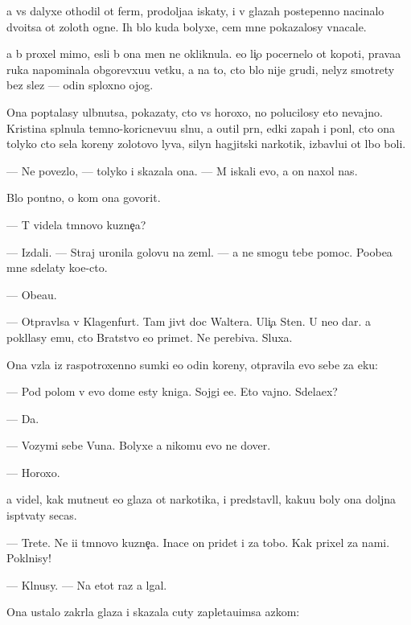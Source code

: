 \documentclass[10pt]{book}
\begin{document}
{\Y}a vs{\e} dalyxe othodil ot ferm{\yi}, prodolja{\y}a iskaty, i v glazah postepenno nacinalo dvo{\y}itsa ot zolot{\yi}h ogne{\y}. Ih b{\yi}lo kuda bolyxe, cem mne pokazalosy vnacale.

{\Y}a b{\yi} proxel mimo, {\y}esli b{\yi} ona men{\ia} ne okliknula. {\y}e{\y}o li{\c}o pocernelo ot kopoti, prava{\y}a ruka napominala obgorevxu{\y}u vetku, a na to, cto b{\yi}lo nije grudi, nelyz{\ia} smotrety bez slez — odin sploxno{\y} ojog.

Ona pop{\yi}talasy ul{\yi}bnutsa, pokazaty, cto vs{\e} horoxo, no polucilosy eto nevajno. Kristina spl{\iu}nula temno-koricnevu{\y}u sl{\iu}nu, {\y}a o{\x}util pr{\ia}n{\yi}{\y}, {\y}edki{\y} zapah i pon{\ia}l, cto ona tolyko cto s{\y}ela koreny zolotovo lyva, silyn{\yi}{\y} hagjitski{\y} narkotik, izbavl{\ia}{\y}u{\x}i{\y} ot l{\iu}bo{\y} boli.

— Ne povezlo, — tolyko i skazala ona. — M{\yi} iskali {\y}evo, a on naxol nas.

B{\yi}lo pon{\ia}tno, o kom ona govorit.

— T{\yi} videla t{\e}mnovo kuzne{\c}a?

— Izdali. — Straj uronila golovu na zeml{\iu}. — {\Y}a ne smogu tebe pomoc. Poobe{\x}a{\y} mne sdelaty ko{\y}e-cto.

— Obe{\x}a{\y}u.

— Otpravl{\ia}{\y}sa v Klagenfurt. Tam jiv{\e}t doc Waltera. Uli{\c}a Sten{\yi}. U ne{\y}o dar. {\Y}a pokl{\ia}lasy {\y}emu, cto Bratstvo {\y}e{\y}o primet. Ne perebiva{\y}. Sluxa{\y}.

Ona vz{\ia}la iz raspotroxenno{\y} sumki {\y}e{\x}o odin koreny, otpravila {\y}evo sebe za {\x}eku:

— Pod polom v {\y}evo dome {\y}esty kniga. Sojgi {\y}e{\y}e. Eto vajno. Sdela{\y}ex?

— Da.

— Vozymi sebe V{\y}una. Bolyxe {\y}a nikomu {\y}evo ne dover{\iu}.

— Horoxo.

{\Y}a videl, kak mutne{\y}ut {\y}e{\y}o glaza ot narkotika, i predstavl{\ia}l, kaku{\y}u boly ona doljna isp{\yi}t{\yi}vaty se{\y}cas.

— Tret{\y}e. Ne i{\x}i t{\e}mnovo kuzne{\c}a. Inace on pridet i za tobo{\y}. Kak prixel za nami. Pokl{\ia}nisy!

— Kl{\ia}nusy. — Na etot raz {\y}a lgal.

Ona ustalo zakr{\yi}la glaza i skazala cuty zapleta{\y}u{\x}imsa {\y}az{\yi}kom:
\end{document}
